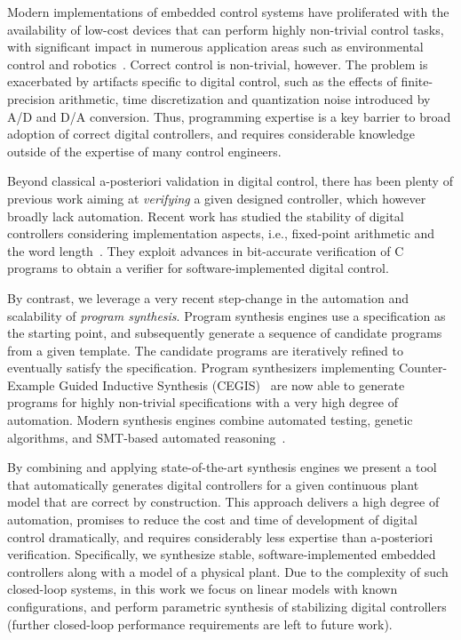 \documentclass[final]{sig-alternate-05-2015}
\begin{document}
Modern implementations of embedded control systems have proliferated with
the availability of low-cost devices that can perform highly non-trivial
control tasks, with significant impact in numerous application areas such as
environmental control and robotics~\cite{astrom1997computer, Franklin15}. 
Correct control is non-trivial, however.  The problem is exacerbated by
artifacts specific to digital control, such as the effects of
finite-precision arithmetic, time discretization and quantization noise
introduced by A/D and D/A conversion.  Thus, programming expertise is a key
barrier to broad adoption of correct digital controllers, and requires
considerable knowledge outside of the expertise of many control engineers.

Beyond classical a-posteriori validation in digital control, there has been
plenty of previous work aiming at \emph{verifying} a given designed
controller, which however broadly lack automation.  Recent work has studied
the stability of digital controllers considering implementation aspects,
i.e., fixed-point arithmetic and the word length~\cite{Bessa16}.  They
exploit advances in bit-accurate verification of C programs to obtain a
verifier for software-implemented digital control.

By contrast, we leverage a very recent step-change in the automation and
scalability of \emph{program synthesis}.  Program synthesis engines use a
specification as the starting point, and subsequently generate a sequence of
candidate programs from a given template.  The candidate programs are
iteratively refined to eventually satisfy the specification.  Program
synthesizers implementing Counter-Example Guided Inductive Synthesis
(CEGIS)~\cite{sketch} are now able to generate programs for highly
non-trivial specifications with a very high degree of automation.  Modern
synthesis engines combine automated testing, genetic algorithms, and
SMT-based automated reasoning~\cite{DBLP:journals/corr/AlurFSS16a,
DBLP:conf/lpar/DavidKL15}.

By combining and applying state-of-the-art synthesis engines we present a
tool that automatically generates digital controllers for a given continuous
plant model that are correct by construction.  This approach delivers a high
degree of automation, promises to reduce the cost and time of development of
digital control dramatically, and requires considerably less expertise than
a-posteriori verification.  Specifically, we synthesize stable,
software-implemented embedded controllers along with a model of a physical
plant.  Due to the complexity of such closed-loop systems, in this work we
focus on linear models with known configurations, and perform parametric
synthesis of stabilizing digital controllers (further closed-loop performance
requirements are left to future work).
\end{document}
